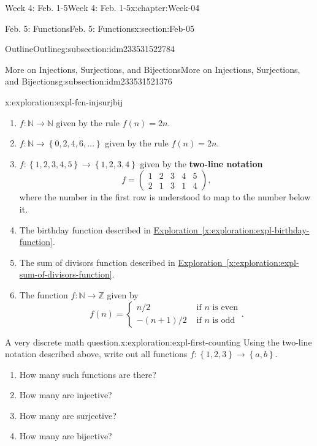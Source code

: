 \documentclass[oneside,10pt,]{book}
\newcommand{\xreffont}{\relax}
\newcommand{\terminology}[1]{\textbf{#1}}
\numberwithin{equation}{section}
\newcommand{\set}[1]{\left\{ {#1} \right\}}
\def\Z{{\mathbb Z}}
\def\N{{\mathbb N}}
\newcommand{\N}{\mathbb N}
\newcommand{\Z}{\mathbb Z}
\newcommand{\amp}{&}
\begin{document}
\begin{chapterptx}{Week 4: Feb. 1-5}{}{Week 4: Feb. 1-5}{}{}{x:chapter:Week-04}
\begin{sectionptx}{Feb. 5: Functions}{}{Feb. 5: Functions}{}{}{x:section:Feb-05}
\begin{subsectionptx}{Outline}{}{Outline}{}{}{g:subsection:idm233531522784}
\begin{subsectionptx}{More on Injections, Surjections, and Bijections}{}{More on Injections, Surjections, and Bijections}{}{}{g:subsection:idm233531521376}
\begin{exploration}{}{x:exploration:expl-fcn-injsurjbij}
\begin{enumerate}
\item{}\(f: \N\to \N\) given by the rule \(f(n) = 2n\).%
\item{}\(f: \N\to \set{0,2,4,6,\ldots}\) given by the rule \(f(n) = 2n\).%
\item{}\(f: \set{1,2,3,4,5}\to \set{1,2,3,4}\) given by the \terminology{two-line notation}%
\begin{equation*}
f = \begin{pmatrix}1 \amp 2 \amp 3 \amp 4 \amp 5 \\ 2 \amp 1 \amp 3 \amp 1\amp 4 \end{pmatrix},
\end{equation*}
where the number in the first row is understood to map to the number below it.%
\item{}The birthday function described in \hyperref[x:exploration:expl-birthday-function]{Exploration~{\xreffont\ref{x:exploration:expl-birthday-function}}}.%
\item{}The sum of divisors function described in \hyperref[x:exploration:expl-sum-of-divisors-function]{Exploration~{\xreffont\ref{x:exploration:expl-sum-of-divisors-function}}}.%
\item{}The function \(f : \N\to\Z\) given by%
\begin{equation*}
f(n) = \begin{cases} n/2 \amp \text{ if } n \text{ is even} \\ -(n+1)/2 \amp \text{ if } n \text{ is odd}\end{cases}.
\end{equation*}
%
\end{enumerate}
\end{exploration}%
\begin{exploration}{A very discrete math question.}{x:exploration:expl-first-counting}%
Using the two-line notation described above, write out all functions \(f: \set{1,2,3}\to \set{a,b}\).%
%
\begin{enumerate}
\item{}How many such functions are there?%
\item{}How many are injective?%
\item{}How many are surjective?%
\item{}How many are bijective?%
\end{enumerate}
\end{exploration}%
\end{subsectionptx}
%
%
\typeout{************************************************}

\end{subsectionptx}
\end{sectionptx}
\end{chapterptx}
\end{document}
